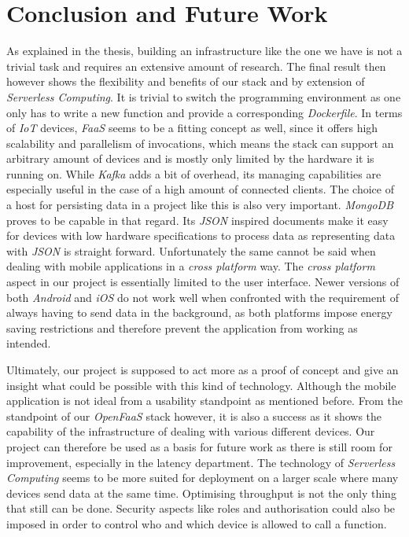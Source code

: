 \chapter{Conclusion and Future Work}
\label{sec:conclusion}

As explained in the thesis, building an infrastructure like the one we have is not a trivial task
and requires an extensive amount of research. The final result then however shows the flexibility
and benefits of our stack and by extension of \textit{Serverless Computing}. It is trivial to switch
the programming environment as one only has to write a new function and provide a corresponding
\textit{Dockerfile}. In terms of \textit{IoT} devices, \textit{FaaS} seems to be a fitting concept
as well, since it offers high scalability and parallelism of invocations, which means the stack can
support an arbitrary amount of devices and is mostly only limited by the hardware it is running on.
While \textit{Kafka} adds a bit of overhead, its managing capabilities are especially useful in the
case of a high amount of connected clients. The choice of a host for persisting data in a project
like this is also very important. \textit{MongoDB} proves to be capable in that regard. Its
\textit{JSON} inspired documents make it easy for devices with low hardware specifications to
process data as representing data with \textit{JSON} is straight forward. Unfortunately the same
cannot be said when dealing with mobile applications in a \textit{cross platform} way. The
\textit{cross platform} aspect in our project is essentially limited to the user interface. Newer
versions of both \textit{Android} and \textit{iOS} do not work well when confronted with the
requirement of always having to send data in the background, as both platforms impose energy saving
restrictions and therefore prevent the application from working as intended.

Ultimately, our project is supposed to act more as a proof of concept and give an insight what could
be possible with this kind of technology. Although the mobile application is not ideal from a
usability standpoint as mentioned before. From the standpoint of our \textit{OpenFaaS} stack
however, it is also a success as it shows the capability of the infrastructure of dealing with
various different devices. Our project can therefore be used as a basis for future work as there is
still room for improvement, especially in the latency department. The technology of
\textit{Serverless Computing} seems to be more suited for deployment on a larger scale where many
devices send data at the same time. Optimising throughput is not the only thing that still can be
done. Security aspects like roles and authorisation could also be imposed in order to control who
and which device is allowed to call a function.
